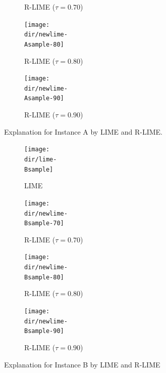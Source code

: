 \documentclass[runningheads]{llncs}
\begin{document}
{{\begin{figure}[p]
\begin{subfigure}[t]{\imgwidth}
          \caption{R-LIME ($\tau=0.70$)}\label{fig:A-rlime-70}
        \end{subfigure}
        \begin{subfigure}[t]{\imgwidth}
          \texttt{[image: \\dir/newlime-\\Asample-80]}
          \caption{R-LIME ($\tau=0.80$)}\label{fig:A-rlime-80}
        \end{subfigure}
        \begin{subfigure}[t]{\imgwidth}
          \texttt{[image: \\dir/newlime-\\Asample-90]}
          \caption{R-LIME ($\tau=0.90$)}\label{fig:A-rlime-90}
        \end{subfigure}
        \caption{Explanation for Instance A by LIME and R-LIME.}\label{fig:A}
      \end{figure}
      \begin{figure}[p]
        \centering
        \begin{subfigure}[t]{\imgwidth}
          \texttt{[image: \\dir/lime-\\Bsample]}
          \caption{LIME}\label{fig:B-lime}
        \end{subfigure}
        \begin{subfigure}[t]{\imgwidth}
          \texttt{[image: \\dir/newlime-\\Bsample-70]}
          \caption{R-LIME ($\tau=0.70$)}\label{fig:B-rlime-70}
        \end{subfigure}
        \begin{subfigure}[t]{\imgwidth}
          \texttt{[image: \\dir/newlime-\\Bsample-80]}
          \caption{R-LIME ($\tau=0.80$)}\label{fig:B-rlime-80}
        \end{subfigure}
        \begin{subfigure}[t]{\imgwidth}
          \hspace{0em}
          \texttt{[image: \\dir/newlime-\\Bsample-90]}
          \caption{R-LIME ($\tau=0.90$)}\label{fig:B-rlime-90}
        \end{subfigure}
        \caption{Explanation for Instance B by LIME and R-LIME}\label{fig:B}
      \end{figure}
    }
  }
\end{document}
